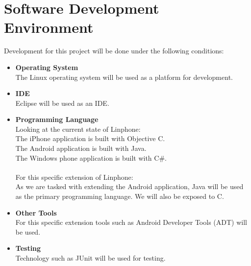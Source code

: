 \documentclass[11pt]{article}
\begin{document}
\section{Software Development Environment}
Development for this project will be done under the following conditions:\\
\begin{itemize}
\item \textbf{Operating System} \\
The Linux operating system will be used as a platform for development.\\
\item \textbf{IDE} \\
Eclipse will be used as an IDE.\\
\item \textbf{Programming Language} \\
Looking at the current state of Linphone:\\
The iPhone application is built with Objective C.\\
The Android application is built with Java.\\
The Windows phone application is built with C\#.\\
\\
For this specific extension of Linphone:\\
As we are tasked with extending the Android application, Java will be used as the primary programming language. We will also be exposed to C.\\
\item \textbf{Other Tools} \\
For this specific extension tools such as Android Developer Tools (ADT) will be used.\\
\item \textbf{Testing} \\
Technology such as JUnit will be used for testing.\\
\end{itemize}
\end{document}
